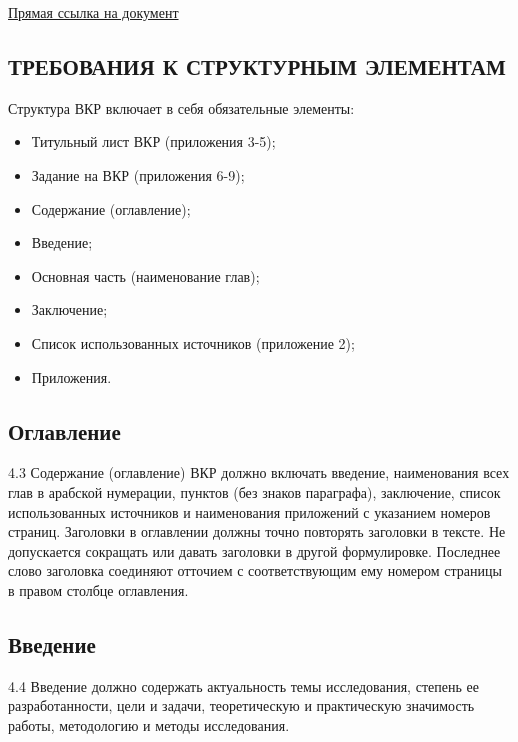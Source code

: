     \href{https://document.vogu35.ru/education-deparment/shablony-makety-dokumentov/gosudarstvennaya-itogovaya-attestatsiya/bakalavriat-spetsialitet-magistratura/1244-vypusknaya-kvalifikatsionnaya-rabota-trebovaniya-k-strukture-soderzhaniyu-i-oformleniyu-1/file}{Прямая ссылка на документ}

    \subsection{ТРЕБОВАНИЯ К СТРУКТУРНЫМ ЭЛЕМЕНТАМ}
    Структура ВКР включает в себя обязательные элементы:
    \begin{itemize}
        \item Титульный лист ВКР (приложения 3-5);
        \item Задание на ВКР (приложения 6-9);
        \item Содержание (оглавление);
        \item Введение;
        \item Основная часть (наименование глав);
        \item Заключение;
        \item Список использованных источников (приложение 2);
        \item Приложения.
    \end{itemize}
    
    \subsection{Оглавление}
    4.3 Содержание (оглавление) ВКР должно включать введение, наименования всех
    глав в арабской нумерации, пунктов (без знаков параграфа), заключение, список
    использованных источников и наименования приложений с указанием номеров страниц.
    Заголовки в оглавлении должны точно повторять заголовки в тексте. Не допускается
    сокращать или давать заголовки в другой формулировке. 
    Последнее слово заголовка
    соединяют отточием с соответствующим ему номером страницы в правом столбце
    оглавления.

    \subsection{Введение}
    4.4 Введение должно содержать актуальность темы исследования, степень ее
    разработанности, цели и задачи, теоретическую и практическую значимость работы,
    методологию и методы исследования.
    
